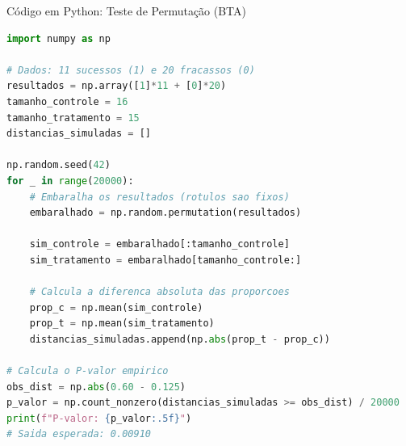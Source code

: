 \begin{frame}[fragile]{Código em Python: Teste de Permutação (BTA)}
\begin{lstlisting}[language=Python]
import numpy as np

# Dados: 11 sucessos (1) e 20 fracassos (0)
resultados = np.array([1]*11 + [0]*20)
tamanho_controle = 16
tamanho_tratamento = 15
distancias_simuladas = []

np.random.seed(42)
for _ in range(20000):
    # Embaralha os resultados (rotulos sao fixos)
    embaralhado = np.random.permutation(resultados)
    
    sim_controle = embaralhado[:tamanho_controle]
    sim_tratamento = embaralhado[tamanho_controle:]
    
    # Calcula a diferenca absoluta das proporcoes
    prop_c = np.mean(sim_controle)
    prop_t = np.mean(sim_tratamento)
    distancias_simuladas.append(np.abs(prop_t - prop_c))

# Calcula o P-valor empirico
obs_dist = np.abs(0.60 - 0.125)
p_valor = np.count_nonzero(distancias_simuladas >= obs_dist) / 20000
print(f"P-valor: {p_valor:.5f}")
# Saida esperada: 0.00910
\end{lstlisting}
\end{frame}
